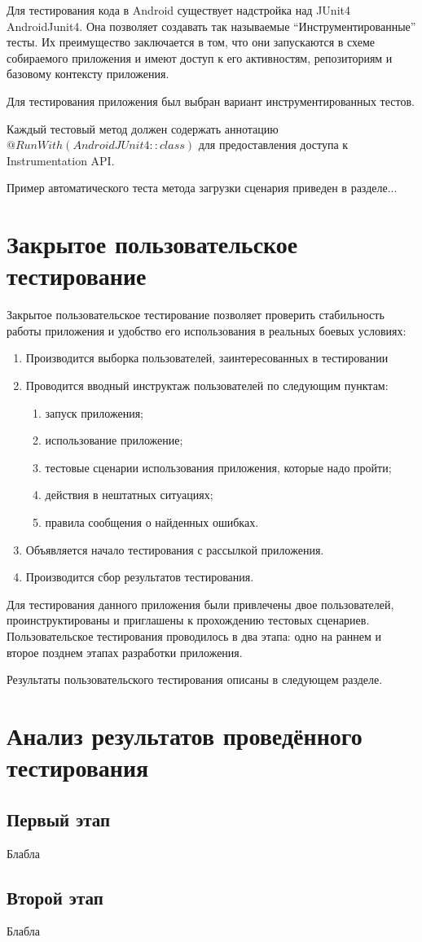 Для тестирования кода в Android существует надстройка над JUnit4 \textemdash\space AndroidJunit4. Она позволяет создавать так называемые ``Инструментированные'' тесты. Их преимущество заключается в том, что они запускаются в схеме собираемого приложения и имеют доступ к его активностям, репозиториям и базовому контексту приложения.

Для тестирования приложения был выбран вариант инструментированных тестов.

Каждый тестовый метод должен содержать аннотацию $@RunWith(AndroidJUnit4::class)$ для предоставления доступа к Instrumentation API.

Пример автоматического теста метода загрузки сценария приведен в разделе...

\section{Закрытое пользовательское тестирование}
\label{sec:usertesting}
Закрытое пользовательское тестирование позволяет проверить стабильность работы приложения и удобство его использования в реальных боевых условиях:
\begin{enumerate}
	\item Производится выборка пользователей, заинтересованных в тестировании
	\item Проводится вводный инструктаж пользователей по следующим пунктам:
	\begin{enumerate}
		\item запуск приложения;
		\item использование приложение;
		\item тестовые сценарии использования приложения, которые надо пройти;
		\item действия в нештатных ситуациях;
		\item правила сообщения о найденных ошибках.
	\end{enumerate}
	\item Объявляется начало тестирования с рассылкой приложения.
	\item Производится сбор результатов тестирования.
\end{enumerate}

Для тестирования данного приложения были привлечены двое пользователей, проинструктированы и приглашены к прохождению тестовых сценариев.
Пользовательское тестирования проводилось в два этапа: одно на раннем и второе позднем этапах разработки приложения.

Результаты пользовательского тестирования описаны в следующем разделе.

\section{Анализ результатов проведённого тестирования}
\subsection*{Первый этап}
Блабла

\subsection*{Второй этап}
Блабла